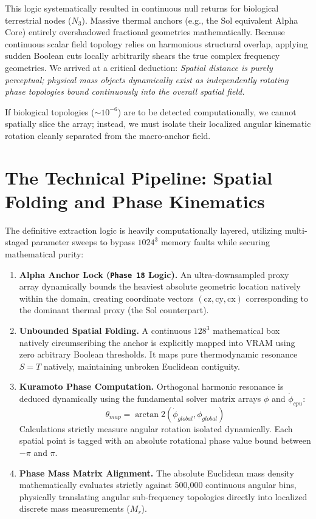 \documentclass[11pt, twoside]{article}
\begin{document}
This logic systematically resulted in continuous null returns for biological terrestrial nodes ($N_3$). Massive thermal anchors (e.g., the Sol equivalent Alpha Core) entirely overshadowed fractional geometries mathematically. Because continuous scalar field topology relies on harmonious structural overlap, applying sudden Boolean cuts locally arbitrarily shears the true complex frequency geometries. We arrived at a critical deduction: \textit{Spatial distance is purely perceptual; physical mass objects dynamically exist as independently rotating phase topologies bound continuously into the overall spatial field.} 

If biological topologies ($\sim 10^{-6}$) are to be detected computationally, we cannot spatially slice the array; instead, we must isolate their localized angular kinematic rotation cleanly separated from the macro-anchor field.

\section{The Technical Pipeline: Spatial Folding and Phase Kinematics}
The definitive extraction logic is heavily computationally layered, utilizing multi-staged parameter sweeps to bypass $1024^3$ memory faults while securing mathematical purity:

\begin{enumerate}[label=\textbf{Stage \arabic*:}, wide, labelwidth=!, labelindent=0pt]
    \item \textbf{Alpha Anchor Lock (\texttt{Phase 18} Logic).} An ultra-downsampled proxy array dynamically bounds the heaviest absolute geometric location natively within the domain, creating coordinate vectors $(\text{cz}, \text{cy}, \text{cx})$ corresponding to the dominant thermal proxy (the Sol counterpart).
    \item \textbf{Unbounded Spatial Folding.} A continuous $128^3$ mathematical box natively circumscribing the anchor is explicitly mapped into VRAM using zero arbitrary Boolean thresholds. It maps pure thermodynamic resonance $S=T$ natively, maintaining unbroken Euclidean contiguity.
    \item \textbf{Kuramoto Phase Computation.} Orthogonal harmonic resonance is deduced dynamically using the fundamental solver matrix arrays $\phi$ and $\dot{\phi}_{cpu}$:
    \begin{equation}
        \theta_{map} = \arctan2 \left( \dot{\phi}_{global}, \phi_{global} \right)
    \end{equation}
    Calculations strictly measure angular rotation isolated dynamically. Each spatial point is tagged with an absolute rotational phase value bound between $-\pi$ and $\pi$.
    \item \textbf{Phase Mass Matrix Alignment.} The absolute Euclidean mass density mathematically evaluates strictly against 500,000 continuous angular bins, physically translating angular sub-frequency topologies directly into localized discrete mass measurements ($M_r$).
\end{enumerate}
\end{document}

